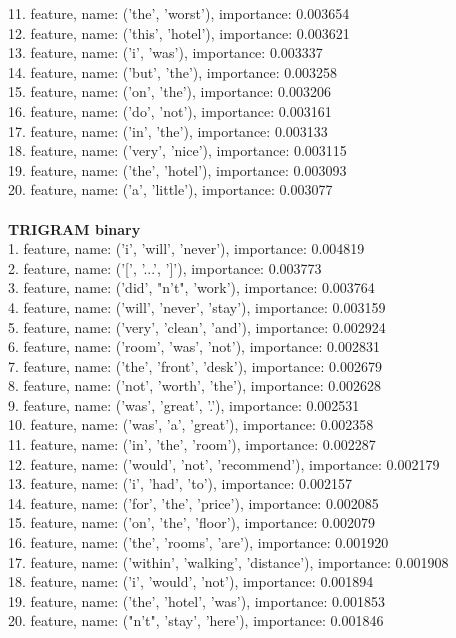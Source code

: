 \documentclass{article}
\begin{document}
11. feature, name: ('the', 'worst'), importance: 0.003654\\
12. feature, name: ('this', 'hotel'), importance: 0.003621\\
13. feature, name: ('i', 'was'), importance: 0.003337\\
14. feature, name: ('but', 'the'), importance: 0.003258\\
15. feature, name: ('on', 'the'), importance: 0.003206\\
16. feature, name: ('do', 'not'), importance: 0.003161\\
17. feature, name: ('in', 'the'), importance: 0.003133\\
18. feature, name: ('very', 'nice'), importance: 0.003115\\
19. feature, name: ('the', 'hotel'), importance: 0.003093\\
20. feature, name: ('a', 'little'), importance: 0.003077
\\ \\
\textbf{TRIGRAM binary}\\
1. feature, name: ('i', 'will', 'never'), importance: 0.004819\\
2. feature, name: ('[', '...', ']'), importance: 0.003773\\
3. feature, name: ('did', "n't", 'work'), importance: 0.003764\\
4. feature, name: ('will', 'never', 'stay'), importance: 0.003159\\
5. feature, name: ('very', 'clean', 'and'), importance: 0.002924\\
6. feature, name: ('room', 'was', 'not'), importance: 0.002831\\
7. feature, name: ('the', 'front', 'desk'), importance: 0.002679\\
8. feature, name: ('not', 'worth', 'the'), importance: 0.002628\\
9. feature, name: ('was', 'great', '.'), importance: 0.002531\\
10. feature, name: ('was', 'a', 'great'), importance: 0.002358\\
11. feature, name: ('in', 'the', 'room'), importance: 0.002287\\
12. feature, name: ('would', 'not', 'recommend'), importance: 0.002179\\
13. feature, name: ('i', 'had', 'to'), importance: 0.002157\\
14. feature, name: ('for', 'the', 'price'), importance: 0.002085\\
15. feature, name: ('on', 'the', 'floor'), importance: 0.002079\\
16. feature, name: ('the', 'rooms', 'are'), importance: 0.001920\\
17. feature, name: ('within', 'walking', 'distance'), importance: 0.001908\\
18. feature, name: ('i', 'would', 'not'), importance: 0.001894\\
19. feature, name: ('the', 'hotel', 'was'), importance: 0.001853\\
20. feature, name: ("n't", 'stay', 'here'), importance: 0.001846
\\ 
\end{document}
